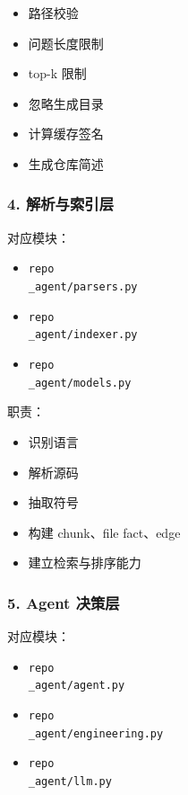 \documentclass[UTF8,12pt,openany]{ctexbook}
\begin{document}
\begin{itemize}
\item 路径校验
\item 问题长度限制
\item top-k 限制
\item 忽略生成目录
\item 计算缓存签名
\item 生成仓库简述
\end{itemize}

\subsubsection{4. 解析与索引层}

对应模块：\par

\begin{itemize}
\item \texttt{repo\\_agent/parsers.py}
\item \texttt{repo\\_agent/indexer.py}
\item \texttt{repo\\_agent/models.py}
\end{itemize}

职责：\par

\begin{itemize}
\item 识别语言
\item 解析源码
\item 抽取符号
\item 构建 chunk、file fact、edge
\item 建立检索与排序能力
\end{itemize}

\subsubsection{5. Agent 决策层}

对应模块：\par

\begin{itemize}
\item \texttt{repo\\_agent/agent.py}
\item \texttt{repo\\_agent/engineering.py}
\item \texttt{repo\\_agent/llm.py}
\end{itemize}
\end{document}
